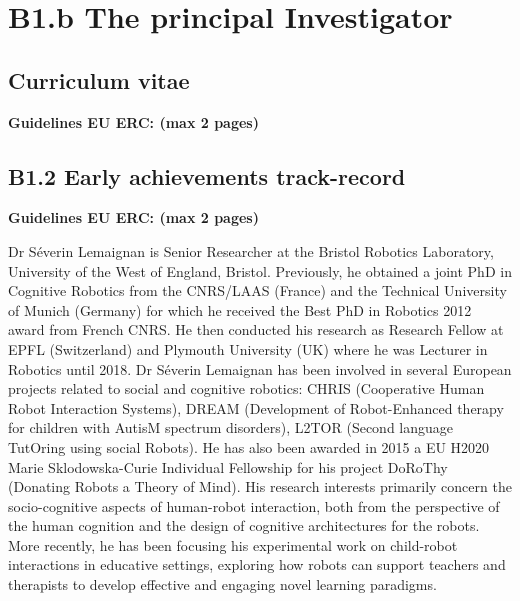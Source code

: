 \documentclass[11pt]{article}
\newcommand{\eu}[1]{{\color{teal}\textbf{Guidelines EU ERC: #1}}}
\begin{document}
\newpage

\section{B1.b The principal Investigator}\label{the-principal-investigator}

\hypertarget{curriculum-vitae}{%
\subsection{Curriculum vitae}\label{curriculum-vitae}}

\eu{(max 2 pages)}

\newpage
\subsection{B1.2 Early achievements track-record}\label{early-achievements-track-record}

\eu{(max 2 pages)}

Dr Séverin Lemaignan is Senior Researcher at the Bristol Robotics
Laboratory, University of the West of England, Bristol. Previously, he
obtained a joint PhD in Cognitive Robotics from the CNRS/LAAS (France)
and the Technical University of Munich (Germany) for which he received
the Best PhD in Robotics 2012 award from French CNRS. He then conducted
his research as Research Fellow at EPFL (Switzerland) and Plymouth
University (UK) where he was Lecturer in Robotics until 2018. Dr Séverin
Lemaignan has been involved in several European projects related to
social and cognitive robotics: CHRIS (Cooperative Human Robot
Interaction Systems), DREAM (Development of Robot-Enhanced therapy for
children with AutisM spectrum disorders), L2TOR (Second language
TutOring using social Robots). He has also been awarded in 2015 a EU
H2020 Marie Sklodowska-Curie Individual Fellowship for his project
DoRoThy (Donating Robots a Theory of Mind). His research interests
primarily concern the socio-cognitive aspects of human-robot
interaction, both from the perspective of the human cognition and the
design of cognitive architectures for the robots. More recently, he has
been focusing his experimental work on child-robot interactions in
educative settings, exploring how robots can support teachers and
therapists to develop effective and engaging novel learning paradigms.
\end{document}
